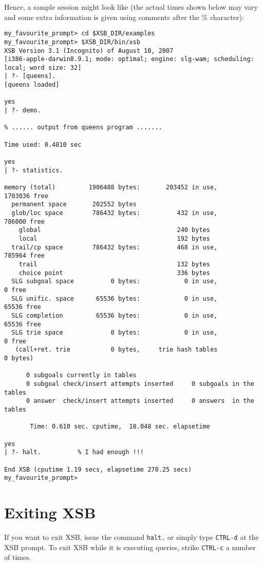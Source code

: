 Hence, a sample session might look like
(the actual times shown below may vary and some extra information is given
using comments after the \% character):

{\footnotesize
 \begin{verbatim}
my_favourite_prompt> cd $XSB_DIR/examples
my_favourite_prompt> $XSB_DIR/bin/xsb
XSB Version 3.1 (Incognito) of August 10, 2007
[i386-apple-darwin8.9.1; mode: optimal; engine: slg-wam; scheduling: local; word size: 32]
| ?- [queens].
[queens loaded]

yes
| ?- demo.

% ...... output from queens program .......

Time used: 0.4810 sec

yes
| ?- statistics.

memory (total)         1906488 bytes:       203452 in use,      1703036 free
  permanent space       202552 bytes
  glob/loc space        786432 bytes:          432 in use,       786000 free
    global                                     240 bytes
    local                                      192 bytes
  trail/cp space        786432 bytes:          468 in use,       785964 free
    trail                                      132 bytes
    choice point                               336 bytes
  SLG subgoal space          0 bytes:            0 in use,            0 free
  SLG unific. space      65536 bytes:            0 in use,        65536 free
  SLG completion         65536 bytes:            0 in use,        65536 free
  SLG trie space             0 bytes:            0 in use,            0 free
   (call+ret. trie           0 bytes,     trie hash tables            0 bytes)

      0 subgoals currently in tables
      0 subgoal check/insert attempts inserted     0 subgoals in the tables
      0 answer  check/insert attempts inserted     0 answers  in the tables

       Time: 0.610 sec. cputime,  18.048 sec. elapsetime

yes
| ?- halt.          % I had enough !!!

End XSB (cputime 1.19 secs, elapsetime 270.25 secs)
my_favourite_prompt>
 \end{verbatim}
}


\section{Exiting XSB}

If you want to exit XSB, issue the command \verb'halt.' or
simply type \verb'CTRL-d' at the XSB prompt. To exit XSB while it is
executing queries, strike \verb'CTRL-c' a number of times.


